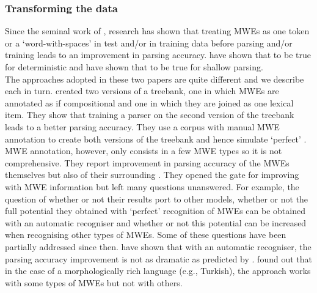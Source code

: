 \documentclass[output=paper]{langsci/langscibook}
\begin{document}
                        \subsubsection{Transforming the data}
                        \label{del:changingdata}
                        \indent Since the seminal work of \citet{nivre2004multiword}, research has shown that treating MWEs as one token or a `word-with-spaces' in test and/or in training data before parsing and/or training leads to an improvement in parsing accuracy. \citet{nivre2004multiword} have shown that to be true for deterministic  and \citet{korkontzelosetal2010} have shown that to be true for shallow parsing. \\
                        \indent The approaches adopted in these two papers are quite different and we describe each in turn.
                        \indent \citet{nivre2004multiword} created two versions of a treebank, one in which MWEs are annotated as if compositional and one in which they are joined as one lexical item. They show that training a parser on the second version of the treebank leads to a better parsing accuracy. They use a corpus with manual MWE annotation to create both versions of the treebank and hence simulate `perfect' . MWE annotation, however, only consists in a few MWE types so it is not comprehensive. They report improvement in parsing accuracy of the MWEs themselves but also of their surrounding . They opened the gate for improving  with MWE information but left many questions unanswered. For example, the question of whether or not their results port to other  models, whether or not the full potential they obtained with `perfect' recognition of MWEs can be obtained with an automatic recogniser and whether or not this potential can be increased when recognising other types of MWEs. Some of these questions have been partially addressed since then. \citet{constant12acl} have shown that with an automatic recogniser, the parsing accuracy improvement is not as dramatic as predicted by \citet{nivre2004multiword}. \citet{eryigit:2011:multiword} found out that in the case of a morphologically rich language (e.g., Turkish), the approach works with some types of MWEs but not with others.
                        \label{del:korkontz}
\end{document}
